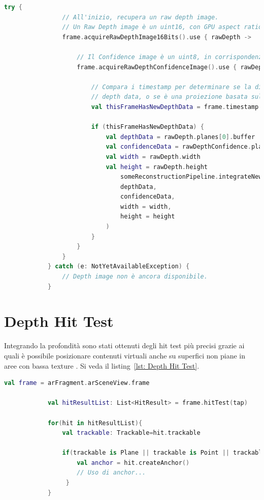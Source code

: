\documentclass[crop=false, class=book]{standalone}
\begin{document}
	\begin{center}
		\begin{minipage}{0.95\textwidth}
			\begin{lstlisting}[caption={Estrazione di un'immagine di confidenza.}, label={lst: confidence-image}, language=Kotlin]
			try {
				// All'inizio, recupera un raw depth image.
				// Un Raw Depth image è un uint16, con GPU aspect ratio e orientamento nativo.
				frame.acquireRawDepthImage16Bits().use { rawDepth ->
					
	 				// Il Confidence image è un uint8, in corrispondenza alla dimensione di depth image.
	 				frame.acquireRawDepthConfidenceImage().use { rawDepthConfidence ->
	 						
		  				// Compara i timestamp per determinare se la distanza è basata su nuovi 
		  				// depth data, o se è una proiezione basata sul movimento del dispositivo.
						val thisFrameHasNewDepthData = frame.timestamp == rawDepth.timestamp
				 
		  				if (thisFrameHasNewDepthData) {	
		    				val depthData = rawDepth.planes[0].buffer
		    				val confidenceData = rawDepthConfidence.planes[0].buffer
		    				val width = rawDepth.width
		    				val height = rawDepth.height
		    					someReconstructionPipeline.integrateNewImage(
		      					depthData,
		      					confidenceData,
		     					width = width,
		      					height = height
		    				)
		  				}
	 				}
				}
			} catch (e: NotYetAvailableException) {
 				// Depth image non è ancora disponibile.
			}	
			\end{lstlisting}
			\end{minipage}
		\end{center}
		
		\section{Depth Hit Test}
		
		Integrando la profondità sono stati ottenuti degli hit test più precisi grazie ai quali è possibile posizionare contenuti virtuali anche su superfici non piane in aree con bassa texture \cite{google2022depth}. Si veda il listing~\vref{lst: Depth Hit Test}.

	\begin{center}
		\begin{minipage}{0.95\textwidth}
			\begin{lstlisting}[caption={Depth Hit Test}, label={lst: Depth Hit Test}, language=Kotlin]
			val frame = arFragment.arSceneView.frame
					
			val hitResultList: List<HitResult> = frame.hitTest(tap)
					
			for(hit in hitResultList){
				val trackable: Trackable=hit.trackable
						
				if(trackable is Plane || trackable is Point || trackable is DepthPoint){
					val anchor = hit.createAnchor()
					// Uso di anchor...
				 }
			}
					
				\end{lstlisting}
			\end{minipage}
		\end{center}
		
\end{document}
